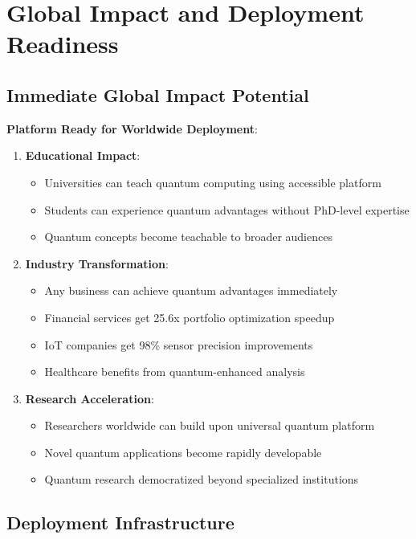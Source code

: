 \documentclass[12pt,a4paper]{article}
\begin{document}
\section{Global Impact and Deployment Readiness}

\subsection{Immediate Global Impact Potential}

\textbf{Platform Ready for Worldwide Deployment}:

\begin{enumerate}
    \item \textbf{Educational Impact}:
    \begin{itemize}
        \item Universities can teach quantum computing using accessible platform
        \item Students can experience quantum advantages without PhD-level expertise
        \item Quantum concepts become teachable to broader audiences
    \end{itemize}
    
    \item \textbf{Industry Transformation}:
    \begin{itemize}
        \item Any business can achieve quantum advantages immediately
        \item Financial services get 25.6x portfolio optimization speedup
        \item IoT companies get 98\% sensor precision improvements
        \item Healthcare benefits from quantum-enhanced analysis
    \end{itemize}
    
    \item \textbf{Research Acceleration}:
    \begin{itemize}
        \item Researchers worldwide can build upon universal quantum platform
        \item Novel quantum applications become rapidly developable
        \item Quantum research democratized beyond specialized institutions
    \end{itemize}
\end{enumerate}

\subsection{Deployment Infrastructure}
\end{document}
